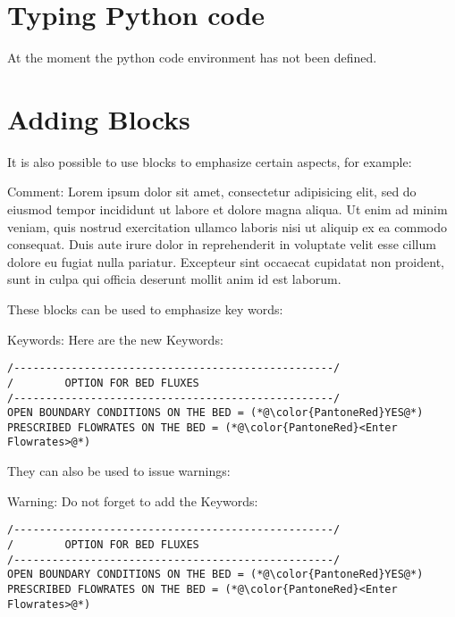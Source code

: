 \section{Typing Python code}

At the moment the python code environment has not been defined.

\section{Adding Blocks}

It is also possible to use blocks to emphasize certain aspects, for example:

\begin{CommentBlock}{Comment:}
Lorem ipsum dolor sit amet, consectetur adipisicing elit, sed do eiusmod tempor
incididunt ut labore et dolore magna aliqua. Ut enim ad minim veniam, quis
nostrud exercitation ullamco laboris nisi ut aliquip ex ea commodo consequat.
Duis aute irure dolor in reprehenderit in voluptate velit esse cillum dolore eu
fugiat nulla pariatur. Excepteur sint occaecat cupidatat non proident, sunt in
culpa qui officia deserunt mollit anim id est laborum.
\end{CommentBlock}

These blocks can be used to emphasize key words:

\begin{CommentBlock}{Keywords:}
Here are the new Keywords:
\lstset{language=TelemacCas,
        basicstyle=\scriptsize\ttfamily}
\begin{lstlisting}[frame=trBL]
/--------------------------------------------------/
/        OPTION FOR BED FLUXES
/--------------------------------------------------/
OPEN BOUNDARY CONDITIONS ON THE BED = (*@\color{PantoneRed}YES@*)
PRESCRIBED FLOWRATES ON THE BED = (*@\color{PantoneRed}<Enter Flowrates>@*)
\end{lstlisting}
\end{CommentBlock}


They can also be used to issue warnings:


\begin{WarningBlock}{Warning:}
Do not forget to add the Keywords:
\lstset{language=TelemacCas,
        basicstyle=\scriptsize\ttfamily}
\begin{lstlisting}[frame=trBL]
/--------------------------------------------------/
/        OPTION FOR BED FLUXES
/--------------------------------------------------/
OPEN BOUNDARY CONDITIONS ON THE BED = (*@\color{PantoneRed}YES@*)
PRESCRIBED FLOWRATES ON THE BED = (*@\color{PantoneRed}<Enter Flowrates>@*)
\end{lstlisting}
\end{WarningBlock}
